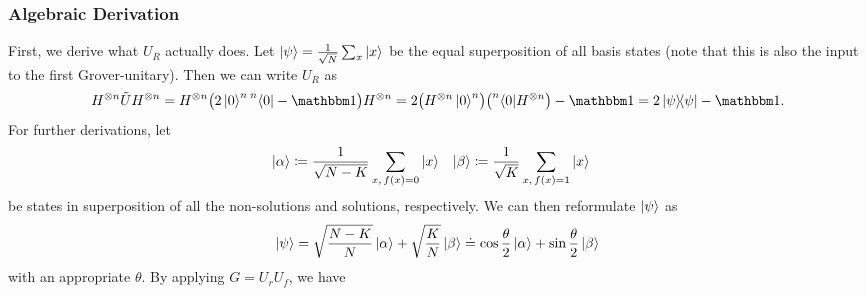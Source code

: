 			\subsubsection{Algebraic Derivation}
				First, we derive what \(U_R\) actually does. Let \( \ket{\psi} = \frac{1}{\sqrt{N}} \sum_x \ket{x} \) be the equal superposition of all basis states (note that this is also the input to the first Grover-unitary). Then we can write \(U_R\) as
				\begin{equation}
					H^{\otimes n} \tilde{U} H^{\otimes n}
						= H^{\otimes n} \bigl( 2 \ket{0}^n\prescript{n}{}{\bra{0}} - \ID \bigr) H^{\otimes n}
						= 2 \bigl( H^{\otimes n} \ket{0}^n \bigr) \bigl( \prescript{n}{}{\bra{0}} H^{\otimes n} \bigr) - \ID
						= 2 \ketbra{\psi}{\psi} - \ID.
				\end{equation}
				For further derivations, let
				\begin{align}
					\ket{\alpha} &\coloneqq \frac{1}{\sqrt{N - K}} \sum_{x,\, f(x) = 0} \ket{x} &
					\ket{\beta} &\coloneqq \frac{1}{\sqrt{K}} \sum_{x,\, f(x) = 1} \ket{x}
				\end{align}
				be states in superposition of all the non-solutions and solutions, respectively. We can then reformulate \(\ket{\psi}\) as
				\begin{equation}
					\ket{\psi}
						= \sqrt{\frac{N - K}{N}} \ket{\alpha} + \sqrt{\frac{K}{N}} \ket{\beta}
						\doteq \cos\frac{\theta}{2} \ket{\alpha} + \sin\frac{\theta}{2} \ket{\beta}
				\end{equation}
				with an appropriate \(\theta\). By applying \( G = U_r U_f \), we have

